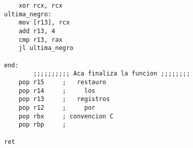\begin{verbatim}
    xor rcx, rcx
ultima_negro:
    mov [r13], rcx
    add r13, 4
    cmp r13, rax
    jl ultima_negro

end:
        ;;;;;;;;;; Aca finaliza la funcion ;;;;;;;;
	pop r15		;   restauro
	pop r14		;     los
	pop r13		;   registros
	pop r12		;     por
	pop rbx		; convencion C
	pop rbp		;

ret

\end{verbatim}
